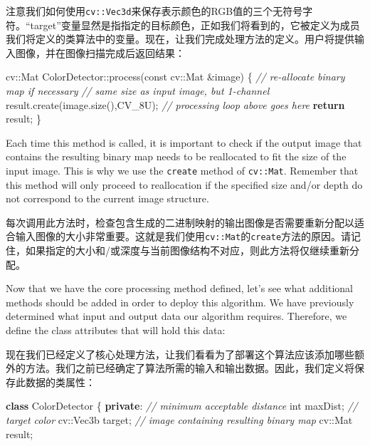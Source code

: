 \documentclass[]{article}
\newenvironment{Shaded}{}{}
\newcommand{\AttributeTok}[1]{\textcolor[rgb]{0.49,0.56,0.16}{#1}}
\newcommand{\CommentTok}[1]{\textcolor[rgb]{0.38,0.63,0.69}{\textit{#1}}}
\newcommand{\ControlFlowTok}[1]{\textcolor[rgb]{0.00,0.44,0.13}{\textbf{#1}}}
\newcommand{\DataTypeTok}[1]{\textcolor[rgb]{0.56,0.13,0.00}{#1}}
\newcommand{\KeywordTok}[1]{\textcolor[rgb]{0.00,0.44,0.13}{\textbf{#1}}}
\newcommand{\NormalTok}[1]{#1}
\begin{document}
注意我们如何使用\texttt{cv::Vec3d}来保存表示颜色的RGB值的三个无符号字符。``target''变量显然是指指定的目标颜色，正如我们将看到的，它被定义为成员我们将定义的类算法中的变量。现在，让我们完成处理方法的定义。用户将提供输入图像，并在图像扫描完成后返回结果：

\begin{Shaded}
\begin{Highlighting}[]
\NormalTok{cv::Mat ColorDetector::process(}\AttributeTok{const}\NormalTok{ cv::Mat &image) \{}
    \CommentTok{// re-allocate binary map if necessary}
    \CommentTok{// same size as input image, but 1-channel}
\NormalTok{    result.create(image.size(),CV_8U);}
    \CommentTok{// processing loop above goes here}
    \ControlFlowTok{return}\NormalTok{ result;}
\NormalTok{\}}
\end{Highlighting}
\end{Shaded}

Each time this method is called, it is important to check if the output
image that contains the resulting binary map needs to be reallocated to
fit the size of the input image. This is why we use the \texttt{create}
method of \texttt{cv::Mat}. Remember that this method will only proceed
to reallocation if the specified size and/or depth do not correspond to
the current image structure.

每次调用此方法时，检查包含生成的二进制映射的输出图像是否需要重新分配以适合输入图像的大小非常重要。这就是我们使用\texttt{cv::Mat}的\texttt{create}方法的原因。请记住，如果指定的大小和/或深度与当前图像结构不对应，则此方法将仅继续重新分配。

Now that we have the core processing method defined, let's see what
additional methods should be added in order to deploy this algorithm. We
have previously determined what input and output data our algorithm
requires. Therefore, we define the class attributes that will hold this
data:

现在我们已经定义了核心处理方法，让我们看看为了部署这个算法应该添加哪些额外的方法。我们之前已经确定了算法所需的输入和输出数据。因此，我们定义将保存此数据的类属性：

\begin{Shaded}
\begin{Highlighting}[]
\KeywordTok{class}\NormalTok{ ColorDetector \{}
    \KeywordTok{private}\NormalTok{:}
    \CommentTok{// minimum acceptable distance}
    \DataTypeTok{int}\NormalTok{ maxDist;}
    \CommentTok{// target color}
\NormalTok{    cv::Vec3b target;}
    \CommentTok{// image containing resulting binary map}
\NormalTok{    cv::Mat result;}
\end{Highlighting}
\end{Shaded}
\end{document}
